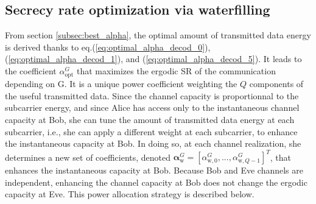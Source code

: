 \documentclass[journal,comsoc]{IEEEtran}
\newcommand{\mat}[1]{\boldsymbol{\mathrm{#1}}}
\begin{document}
\subsection{Secrecy rate optimization via waterfilling}
\label{subsec:perf_waterf}
From section \ref{subsec:best_alpha}, the optimal amount of transmitted data energy is derived thanks to eq.(\ref{eq:optimal_alpha_decod_0}), (\ref{eq:optimal_alpha_decod_1}), and (\ref{eq:optimal_alpha_decod_5}). It leads to the coefficient $\alpha_{\text{opt}}^G$ that maximizes the ergodic SR of the communication depending on $\mat{G}$. It is a unique power coefficient weighting the $Q$ components of the useful transmitted data.  Since the channel capacity is proportionnal to the subcarrier energy, and since Alice has access only to the instantaneous channel capacity at Bob, she can tune the amount of transmitted data energy at each subcarrier, i.e., she can apply a different weight at each subcarrier, to enhance the instantaneous capacity at Bob. In doing so, at each channel realization, she determines a new set of coefficients, denoted $\boldsymbol\alpha_{\text{w}}^G = [\alpha_{\text{w},0}^G,...,\alpha_{\text{w},Q-1}^G]^T $, that enhances the instantaneous capacity at Bob. Because Bob and Eve channels are independent, enhancing the channel capacity at Bob does not change the ergodic capacity at Eve. This power allocation strategy is described below. 
\end{document}

